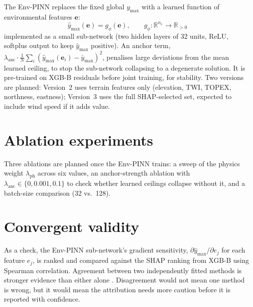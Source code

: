 The Env-PINN replaces the fixed global $y_{\max}$ with a learned function of environmental features $\mathbf{e}$:
\[
\hat{y}_{\max}(\mathbf{e}) = g_\phi(\mathbf{e}), \qquad g_\phi : \mathbb{R}^{n_e} \to \mathbb{R}_{>0}
\]
implemented as a small sub-network (two hidden layers of 32 units, ReLU, softplus output to keep $\hat{y}_{\max}$ positive). An anchor term, $\lambda_{\text{anc}} \cdot \frac{1}{N}\sum_i (\hat{y}_{\max}(\mathbf{e}_i) - \bar{y}_{\max})^2$, penalises large deviations from the mean learned ceiling, to stop the sub-network collapsing to a degenerate solution. It is pre-trained on XGB-B residuals before joint training, for stability. Two versions are planned: Version~2 uses terrain features only (elevation, TWI, TOPEX, northness, eastness); Version~3 uses the full SHAP-selected set, expected to include wind speed if it adds value.

\section{Ablation experiments}

Three ablations are planned once the Env-PINN trains: a sweep of the physics weight $\lambda_{\text{ph}}$ across six values, an anchor-strength ablation with $\lambda_{\text{anc}} \in \{0, 0.001, 0.1\}$ to check whether learned ceilings collapse without it, and a batch-size comparison (32 vs.\ 128).

\section{Convergent validity}

As a check, the Env-PINN sub-network's gradient sensitivity, $\partial \hat{y}_{\max} / \partial e_j$ for each feature $e_j$, is ranked and compared against the SHAP ranking from XGB-B using Spearman correlation. Agreement between two independently fitted methods is stronger evidence than either alone \citep{karniadakis2021PhysicsinformedMachineLearning, lundberg2017UnifiedApproachInterpreting}. Disagreement would not mean one method is wrong, but it would mean the attribution needs more caution before it is reported with confidence.
